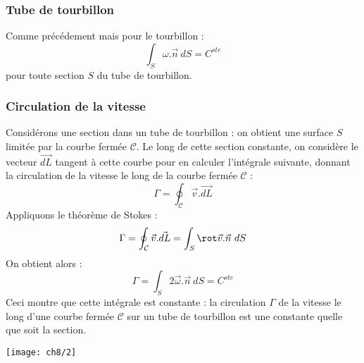 		\subsubsection{Tube de tourbillon}
		Comme précédement mais pour le tourbillon :
		\begin{equation}
		\int_S \omega.\vec{n}\ dS = C^{ste}
		\end{equation}
		pour toute section $S$ du tube de tourbillon.
		
		
		\subsubsection{Circulation de la vitesse}
		Considérons une section dans un tube de tourbillon : on obtient une
		surface $S$ limitée par la courbe fermée $\mathcal{C}$. Le long de cette 
		section constante, on considère le vecteur $\vec{dL}$ tangent à cette courbe 
		pour en calculer l'intégrale suivante, donnant la circulation de la vitesse 
		le long de la courbe fermée $\mathcal{C}$ :
		\begin{equation}
		\Gamma = \oint_\mathcal{C} \vec{v}.\vec{dL}
		\end{equation}
		Appliquons le théorème de Stokes :
		\begin{equation}
		\Gamma = \oint_\mathcal{C} \vec{v}.\vec{dL} = \int_S \rot \vec{v}.\vec{n}\ dS
		\end{equation}
		On obtient alors :
		\begin{equation}
		\Gamma = \int_S 2\vec{\omega}.\vec{n}\ dS = C^{ste}
		\end{equation}
		Ceci montre que cette intégrale est constante : la circulation $\Gamma$ de la 
		vitesse le long d'une courbe fermée $\mathcal{C}$ sur un tube de tourbillon est 
		une constante quelle que soit la section.\\
\begin{center}
\texttt{[image: ch8/2]}
\end{center}